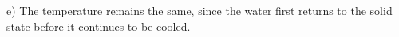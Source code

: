 e) The temperature remains the same, since the water first returns to the solid state before it continues to be cooled.